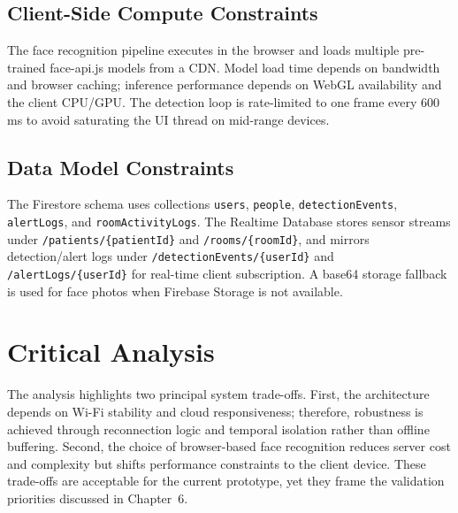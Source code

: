 \subsection*{Client-Side Compute Constraints}

The face recognition pipeline executes in the browser and loads multiple
pre-trained face-api.js models from a CDN. Model load time depends on bandwidth
and browser caching; inference performance depends on WebGL availability and the
client CPU/GPU. The detection loop is rate-limited to one frame every 600\,ms to
avoid saturating the UI thread on mid-range devices.

\subsection*{Data Model Constraints}

The Firestore schema uses collections \texttt{users}, \texttt{people},
\texttt{detectionEvents}, \texttt{alertLogs}, and \texttt{roomActivityLogs}.
The Realtime Database stores sensor streams under \texttt{/patients/\{patientId\}}
and \texttt{/rooms/\{roomId\}}, and mirrors detection/alert logs under
\texttt{/detectionEvents/\{userId\}} and \texttt{/alertLogs/\{userId\}} for
real-time client subscription. A base64 storage fallback is used for face
photos when Firebase Storage is not available.

\section{Critical Analysis}

The analysis highlights two principal system trade-offs. First, the architecture depends on Wi-Fi stability and cloud responsiveness; therefore, robustness is achieved through reconnection logic and temporal isolation rather than offline buffering. Second, the choice of browser-based face recognition reduces server cost and complexity but shifts performance constraints to the client device. These trade-offs are acceptable for the current prototype, yet they frame the validation priorities discussed in Chapter~6.
